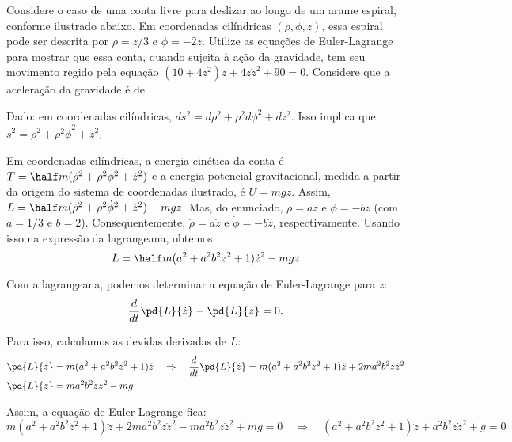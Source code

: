 \begin{question}
	Considere o caso de uma conta livre para deslizar ao longo de um arame espiral, conforme ilustrado abaixo.
	Em coordenadas cilíndricas $(\rho, \phi, z)$, essa espiral pode ser descrita por $\rho = z/3$ e $\phi = -2z$. %
	Utilize as equações de Euler-Lagrange para mostrar que essa conta, quando sujeita à ação da gravidade, tem seu movimento regido pela equação $(10 + 4z^2)\ddot z + 4z\dot z^2 + 90 = 0$. %
	Considere que a aceleração da gravidade é de .


	\begin{compactdesc}
		\item[Dado:] em coordenadas cilíndricas, $ds^2 = d\rho^2 + \rho^2 d\phi^2 + dz^2$.
		Isso implica que $\dot s^2 = \dot\rho^2 + \rho^2 \dot\phi^2 + \dot z^2$.
	\end{compactdesc}

	\begin{solution}
		Em coordenadas cilíndricas, a energia cinética da conta é $T = \half m (\dot\rho^2 + \rho^2\dot\phi^2 + \dot z^2)$ e a energia potencial gravitacional, medida a partir da origem do sistema de coordenadas ilustrado, é $U = mgz$.
		Assim, $L = \half m (\dot\rho^2 + \rho^2\dot\phi^2 + \dot z^2) - mgz$.
		Mas, do enunciado, $\rho = az$ e $\phi = -bz$ (com $a = 1/3$ e $b = 2$). %
		Consequentemente, $\dot\rho = a\dot z$ e $\dot \phi = -b\dot z$, respectivamente.
		Usando isso na expressão da lagrangeana, obtemos:
		\begin{equation*}
			L = \half m (a^2 + a^2 b^2 z^2 + 1) \dot z^2 - mgz
		\end{equation*}

		Com a lagrangeana, podemos determinar a equação de Euler-Lagrange para $z$:
		\begin{equation*}
			\frac{d}{dt}\pd{L}{\dot z} - \pd{L}{z} = 0.
		\end{equation*}

		Para isso, calculamos as devidas derivadas de $L$:
		\begin{align*}
			\pd{L}{\dot z} &= m (a^2 + a^2 b^2 z^2 + 1) \dot z \quad\Rightarrow\quad
				\frac{d}{dt}\pd{L}{\dot z} = m (a^2 + a^2 b^2 z^2 + 1) \ddot z + 2ma^2b^2z\dot z^2 \\
			\pd{L}{z} &= ma^2b^2z\dot z^2 - mg
		\end{align*}

		Assim, a equação de Euler-Lagrange fica:
		\begin{equation*}
			m (a^2 + a^2 b^2 z^2 + 1) \ddot z + 2ma^2b^2z\dot z^2 - ma^2b^2z\dot z^2 + mg = 0
			\quad\Rightarrow\quad
			(a^2 + a^2 b^2 z^2 + 1) \ddot z + a^2b^2z\dot z^2 + g = 0
		\end{equation*}


\end{solution}
\end{question}
